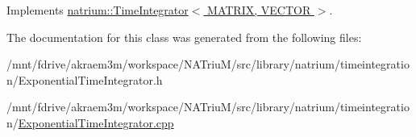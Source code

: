 Implements \hyperlink{classnatrium_1_1TimeIntegrator_a1c438e41d183d172d524aa5dc97785fb}{natrium::TimeIntegrator$<$ MATRIX, VECTOR $>$}.

The documentation for this class was generated from the following files:\begin{DoxyCompactItemize}
\item 
/mnt/fdrive/akraem3m/workspace/NATriuM/src/library/natrium/timeintegration/ExponentialTimeIntegrator.h\item 
/mnt/fdrive/akraem3m/workspace/NATriuM/src/library/natrium/timeintegration/\hyperlink{ExponentialTimeIntegrator_8cpp}{ExponentialTimeIntegrator.cpp}\end{DoxyCompactItemize}
